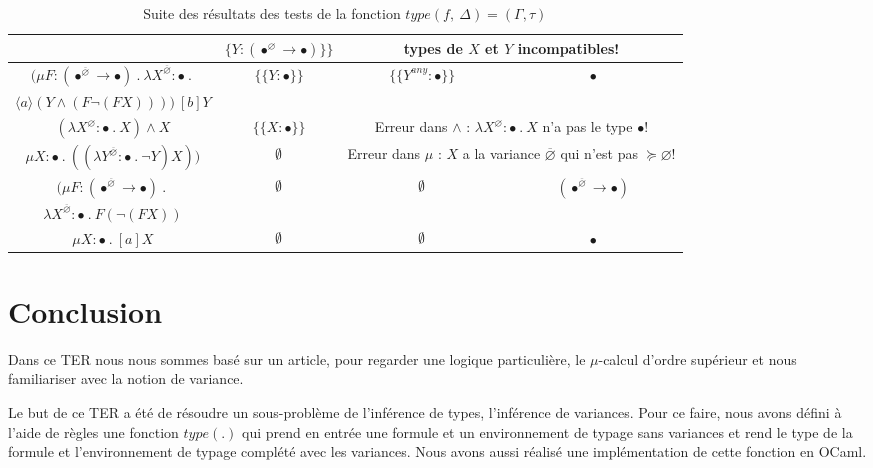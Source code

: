 \documentclass{rapport}
\renewcommand{\emptyset}{\font\cmsy = cmsy10 at 10pt
 \hbox{\cmsy \char 59}
}
\theoremstyle{plain}
\theoremstyle{remark}
\theoremstyle{definition}
\begin{document}
\begin{table}[H]
\begin{tabular}[b]{|c|c||c|c|}
 	& $\{Y : (\bullet^{\varnothing} \rightarrow \bullet)\}\}$ & \multicolumn{2}{c|}{types de $X$ et $Y$ incompatibles!} \\
 	\hline
 	$(\mu F : (\bullet^{\overline{\varnothing}} \rightarrow \bullet) \ . \ \lambda X^{\overline{\varnothing}} : \bullet \ . \ $ & $\{\{Y : \bullet\}\}$ & $\{\{Y^{any} : \bullet\}\}$ & $\bullet$ \\
 	$\langle a \rangle (Y \wedge (F \neg(F X)))) \ [b] Y$ & & & \\
 	\hline
 	$(\lambda X^{\varnothing} : \bullet \ . \ X) \wedge X$ & $\{\{X : \bullet\}\}$ & \multicolumn{2}{c|}{Erreur dans $\wedge$ : $\lambda X^{\varnothing} : \bullet \ . \ X$ n'a pas le type $\bullet$!} \\
 	\hline
 	$\mu X : \bullet \ . \  ((\lambda Y^{\overline{\varnothing}} : \bullet \ . \ \neg Y)X))$ & $\emptyset$ & \multicolumn{2}{c|}{Erreur dans $\mu$ : $X$ a la variance ${\overline{\varnothing}}$ qui n'est pas $\succcurlyeq \varnothing$!} \\
 	\hline
 	$(\mu F : (\bullet^{\overline{\varnothing}} \rightarrow \bullet) \ . \ $ & $\emptyset$ & $\emptyset$ & $(\bullet^{\overline{\varnothing}} \rightarrow \bullet)$ \\
 	$\lambda X^{\overline{\varnothing}} : \bullet \ . \ F (\neg (F X)) $ & & & \\
 	\hline
 	$\mu X : \bullet \ . \ [a]X$ & $\emptyset$ & $\emptyset$ & $\bullet$ \\
 	\hline
    \end{tabular}
    \caption{Suite des résultats des tests de la fonction $type(f, \ \Delta) = (\Gamma, \tau)$}
    \label{table : résultats2}
\end{table}

\section{Conclusion}

Dans ce TER nous nous sommes basé sur un article, \citep{lange2014model} pour regarder une logique particulière, le $\mu$-calcul d'ordre supérieur et nous familiariser avec la notion de variance.

Le but de ce TER a été de résoudre un sous-problème de l'inférence de types, l'inférence de variances. Pour ce faire, nous avons défini à l'aide de règles une fonction $type(.)$ qui prend en entrée une formule et un environnement de typage sans variances et rend le type de la formule et l'environnement de typage complété avec les variances. Nous avons aussi réalisé une implémentation de cette fonction en OCaml.
\end{document}
